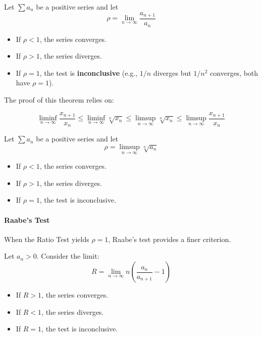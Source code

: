 \begin{theorem}
Let $\sum a_n$ be a positive series and let
\[ \rho = \lim_{n \to \infty} \frac{a_{n+1}}{a_n} \]
\begin{itemize}
    \item If $\rho < 1$, the series converges.
    \item If $\rho > 1$, the series diverges.
    \item If $\rho = 1$, the test is \textbf{inconclusive} (e.g., $1/n$ diverges but $1/n^2$ converges, both have $\rho=1$).
\end{itemize}
\end{theorem}

The proof of this theorem relies on:

\[
\liminf_{n \to \infty} \frac{x_{n+1}}{x_n} \leq \liminf_{n \to \infty} \sqrt[n]{x_n} \leq \limsup_{n \to \infty} \sqrt[n]{x_n} \leq \limsup_{n \to \infty} \frac{x_{n+1}}{x_n}
\]



\begin{theorem}
Let $\sum a_n$ be a positive series and let
\[ \rho = \limsup_{n \to \infty} \sqrt[n]{a_n} \]
\begin{itemize}
    \item If $\rho < 1$, the series converges.
    \item If $\rho > 1$, the series diverges.
    \item If $\rho = 1$, the test is inconclusive.
\end{itemize}
\end{theorem}

\paragraph{Raabe's Test}
When the Ratio Test yields $\rho = 1$, Raabe's test provides a finer criterion.

\begin{theorem}
Let $a_n > 0$. Consider the limit:
\[ R = \lim_{n \to \infty} n \left( \frac{a_n}{a_{n+1}} - 1 \right) \]
\begin{itemize}
    \item If $R > 1$, the series converges.
    \item If $R < 1$, the series diverges.
    \item If $R = 1$, the test is inconclusive.
\end{itemize}
\end{theorem}

